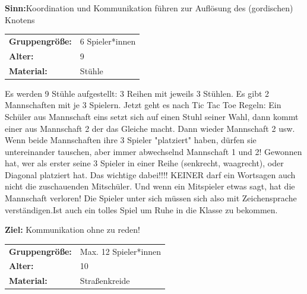 \textbf{Sinn:}Koordination und Kommunikation führen zur Auflösung des (gordischen) Knotens


\begin{table}[H]
\begin{tabular}{>{\bfseries}lp{8cm}}
   Gruppengröße:   & 6 Spieler*innen\\
    Alter: & 9 \\
    Material: & Stühle \\ 
\end{tabular}
\end{table} 

Es werden 9 Stühle aufgestellt: 3 Reihen mit jeweils 3 Stühlen. Es gibt 2 Mannschaften mit je 3 Spielern. Jetzt geht es nach Tic Tac Toe Regeln: Ein Schüler aus Mannschaft eins setzt sich auf einen Stuhl seiner Wahl, dann kommt einer aus Mannschaft 2 der das Gleiche macht. Dann wieder Mannschaft 2 usw. Wenn beide Mannschaften ihre 3 Spieler "platziert" haben, dürfen sie untereinander tauschen, aber immer abwechselnd Mannschaft 1 und 2! Gewonnen hat, wer als erster seine 3 Spieler in einer Reihe (senkrecht, waagrecht), oder Diagonal platziert hat. Das wichtige dabei!!!! KEINER darf ein Wortsagen auch nicht die zuschauenden Mitschüler. Und wenn ein Mitspieler etwas sagt, hat die Mannschaft verloren! Die Spieler unter sich müssen sich also mit Zeichensprache verständigen.Ist auch ein tolles Spiel um Ruhe in die Klasse zu bekommen.

\textbf{Ziel:} Kommunikation ohne zu reden!
\\
\newpage
\begin{table}[H]
\begin{tabular}{>{\bfseries}lp{8cm}}
   Gruppengröße:   & Max. 12 Spieler*innen\\
    Alter: & 10 \\
    Material: & Straßenkreide \\ 
\end{tabular}
\end{table} 


